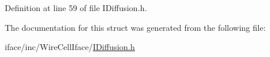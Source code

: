 Definition at line 59 of file I\+Diffusion.\+h.



The documentation for this struct was generated from the following file\+:\begin{DoxyCompactItemize}
\item 
iface/inc/\+Wire\+Cell\+Iface/\hyperlink{_i_diffusion_8h}{I\+Diffusion.\+h}\end{DoxyCompactItemize}
